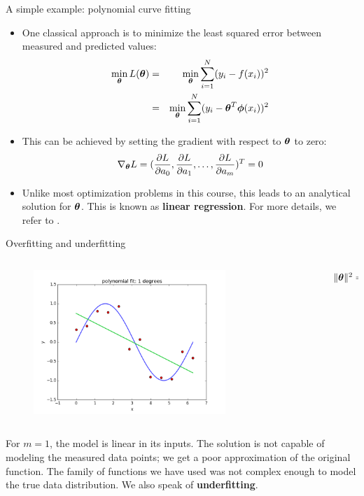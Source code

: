 \documentclass[xcolor=pdftex,dvipsnames,table,mathserif]{beamer}
\begin{document}
\begin{frame}{A simple example: polynomial curve fitting}
\begin{itemize}
	\item One classical approach is to minimize the least squared error between measured and predicted values:
	\begin{eqnarray}
		\min_{\boldsymbol{\theta}} L(\boldsymbol{\theta}) &=& \min_{\boldsymbol{\theta}} \sum_{i=1}^N (y_i - f(x_i))^2 \nonumber \\
		&=& \min_{\boldsymbol{\theta}} \sum_{i=1}^N (y_i - \boldsymbol{\theta}^T \boldsymbol{\phi} (x_i))^2
	\end{eqnarray}
	\item This can be achieved by setting the gradient with respect to $\boldsymbol{\theta}$ to zero:
	\begin{equation}
		\nabla_{\boldsymbol{\theta}} L = (\frac{\partial L}{\partial a_0}, \frac{\partial L}{\partial a_1}, \ldots, \frac{\partial L}{\partial a_m} )^T = 0
	\end{equation}
	\item Unlike most optimization problems in this course, this leads to an analytical solution for $\boldsymbol{\theta}$. This is known as \textbf{linear regression}. For more details, we refer to \cite{Hastie2009}.
\end{itemize}
\end{frame}

\begin{frame}{Overfitting and underfitting}
\begin{columns}
\begin{column}{.8\textwidth}
\begin{figure}[htb]
	\includegraphics[width=0.75\textwidth]{../graphics/polyfit_degree_1.png}
\end{figure}
\end{column}
\begin{column}{.2\textwidth}
$\| \boldsymbol{\theta} \|^2 = 0.67$
\end{column}
\end{columns}
For $m=1$, the model is linear in its inputs. The solution is not capable of modeling the measured data points; we get a poor approximation of the original function. The family of functions we have used was not complex enough to model the true data distribution. We also speak of \textbf{underfitting}.
\end{frame}
\end{document}
